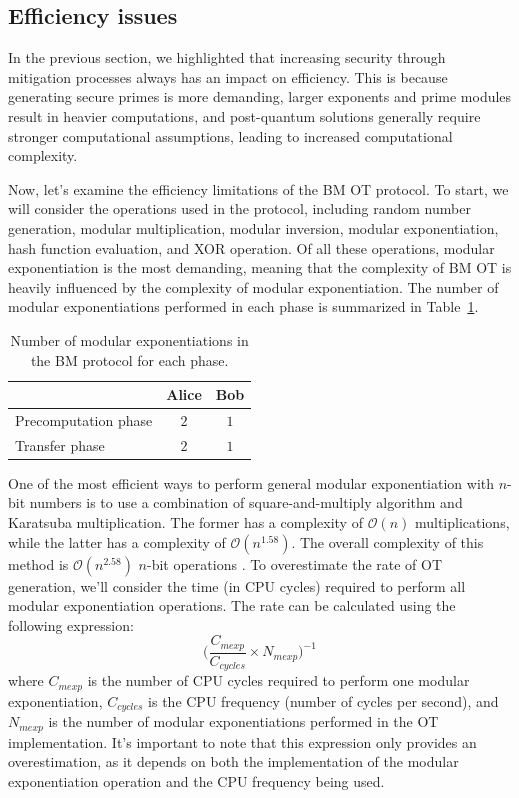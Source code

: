 \subsection{Efficiency issues}


In the previous section, we highlighted that increasing security through mitigation processes always has an impact on efficiency. This is because generating secure primes is more demanding, larger exponents and prime modules result in heavier computations, and post-quantum solutions generally require stronger computational assumptions, leading to increased computational complexity.

Now, let's examine the efficiency limitations of the BM OT protocol. To start, we will consider the operations used in the protocol, including random number generation, modular multiplication, modular inversion, modular exponentiation, hash function evaluation, and XOR operation. Of all these operations, modular exponentiation is the most demanding, meaning that the complexity of BM OT is heavily influenced by the complexity of modular exponentiation. The number of modular exponentiations performed in each phase is summarized in Table~\ref{table:BMOT_mexp}.

\begin{table}[h!]
\centering
\begin{tabular}{lcc}
\toprule
 & Alice & Bob \\
\midrule
\multicolumn{1}{l}{Precomputation phase}   & $2$  & $1$  \\
\multicolumn{1}{l}{Transfer phase} & $2$  & $1$\\
\bottomrule
\end{tabular}
\caption{Number of modular exponentiations in the BM protocol for each phase.}
\label{table:BMOT_mexp}
\end{table}


One of the most efficient ways to perform general modular exponentiation with $n$-bit numbers is to use a combination of square-and-multiply algorithm and Karatsuba multiplication. The former has a complexity of $\mathcal{O}(n)$ multiplications, while the latter has a complexity of $\mathcal{O}(n^{1.58})$. The overall complexity of this method is $\mathcal{O}(n^{2.58})$ $n$-bit operations \cite{MVV01}. To overestimate the rate of OT generation, we'll consider the time (in CPU cycles) required to perform all modular exponentiation operations. The rate can be calculated using the following expression:
\begin{equation}
\label{eq:nOTs}
\Big( \frac{C_{mexp}}{C_{cycles}} \times N_{mexp} \Big)^{-1}
\end{equation}
where $C_{mexp}$ is the number of CPU cycles required to perform one modular exponentiation, $C_{cycles}$ is the CPU frequency (number of cycles per second), and $N_{mexp}$ is the number of modular exponentiations performed in the OT implementation. It's important to note that this expression only provides an overestimation, as it depends on both the implementation of the modular exponentiation operation and the CPU frequency being used.





